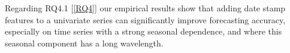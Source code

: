 Regarding RQ4.1 [\ref{RQ4}] our empirical results show that adding date stamp features to
a univariate series can significantly improve forecasting accuracy, especially
on time series with a strong seasonal dependence, and where this seasonal component
has a long wavelength.


